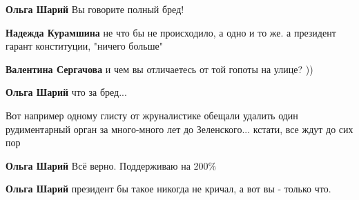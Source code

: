 \begin{itemize}
\begin{itemize}
\textbf{Ольга Шарий} Вы говорите полный бред!

 
\textbf{Надежда Курамшина} не что бы не происходило, а одно и то же. а президент гарант конституции, "ничего больше"

 
\textbf{Валентина Сергачова} и чем вы отличаетесь от той гопоты на улице? ))

 
\textbf{Ольга Шарий} что за бред...

 

Вот например одному глисту от жруналистике обещали удалить один рудиментарный
орган за много-много лет до Зеленского... кстати, все ждут до сих пор


 
\textbf{Ольга Шарий} Всё верно. Поддерживаю на 200\%

 
\textbf{Ольга Шарий} президент бы такое никогда не кричал, а вот вы - только что.


\end{itemize}
\end{itemize}
